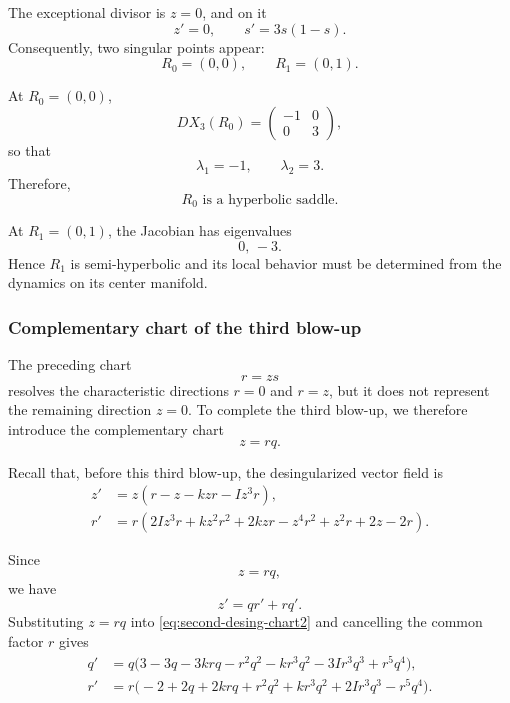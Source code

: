 \documentclass[11pt,reqno]{amsart}
\theoremstyle{plain}
\theoremstyle{definition}
\theoremstyle{remark}
\begin{document}
The exceptional divisor is $z=0$, and on it
\[
z'=0,
\qquad
s'=3s(1-s).
\]
Consequently, two singular points appear:
\[
R_0=(0,0),
\qquad
R_1=(0,1).
\]

At $R_0=(0,0)$,
\[
D X_3(R_0)
=
\begin{pmatrix}
-1&0\\
0&3
\end{pmatrix},
\]
so that
\[
\lambda_1=-1,
\qquad
\lambda_2=3.
\]
Therefore,
\[
\boxed{R_0\text{ is a hyperbolic saddle}.}
\]

At $R_1=(0,1)$, the Jacobian has eigenvalues
\[
\boxed{0,\,-3}.
\]
Hence $R_1$ is semi-hyperbolic and its local behavior must be
determined from the dynamics on its center manifold.

\subsubsection{Complementary chart of the third blow-up}
\label{subsubsec:third-complementary}

The preceding chart
\[
r=zs
\]
resolves the characteristic directions $r=0$ and $r=z$, but it does
not represent the remaining direction $z=0$. To complete the third
blow-up, we therefore introduce the complementary chart
\begin{equation}
\label{eq:third-complementary}
z=rq.
\end{equation}

Recall that, before this third blow-up, the desingularized vector field
is
\begin{equation}
\label{eq:second-desing-chart2}
\begin{aligned}
z'
&=
z\left(
r-z-kzr-Iz^3r
\right),
\\
r'
&=
r\left(
2Iz^3r
+kz^2r^2
+2kzr
-z^4r^2
+z^2r
+2z
-2r
\right).
\end{aligned}
\end{equation}

Since
\[
z=rq,
\]
we have
\[
z'=q r'+r q'.
\]
Substituting $z=rq$ into \eqref{eq:second-desing-chart2} and cancelling
the common factor $r$ gives
\begin{equation}
\label{eq:third-complementary-desing}
\begin{aligned}
q'
&=
q\Big(
3-3q
-3krq
-r^2q^2
-kr^3q^2
-3Ir^3q^3
+r^5q^4
\Big),
\\
r'
&=
r\Big(
-2+2q
+2krq
+r^2q^2
+kr^3q^2
+2Ir^3q^3
-r^5q^4
\Big).
\end{aligned}
\end{equation}
\end{document}
